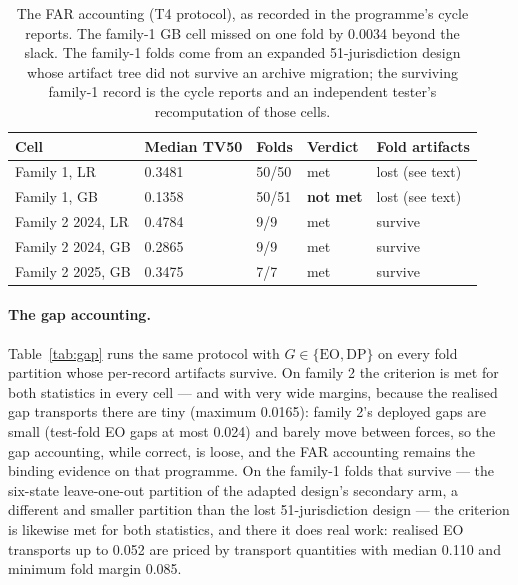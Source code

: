 \documentclass[11pt]{article}
\begin{document}
\begin{table}[h]
\centering
\begin{tabular}{lllll}
\toprule
Cell & Median TV50 & Folds & Verdict & Fold artifacts \\
\midrule
Family 1, LR & 0.3481 & 50/50 & met & lost (see text) \\
Family 1, GB & 0.1358 & 50/51 & \textbf{not met} & lost (see text) \\
Family 2 2024, LR & 0.4784 & 9/9 & met & survive \\
Family 2 2024, GB & 0.2865 & 9/9 & met & survive \\
Family 2 2025, GB & 0.3475 & 7/7 & met & survive \\
\bottomrule
\end{tabular}
\caption{The FAR accounting (T4 protocol), as recorded in the
programme's cycle reports. The family-1 GB cell missed on one fold
by 0.0034 beyond the slack. The family-1 folds come from an
expanded 51-jurisdiction design whose artifact tree did not survive
an archive migration; the surviving family-1 record is the cycle
reports and an independent tester's recomputation of those cells.}
\label{tab:far}
\end{table}

\paragraph{The gap accounting.} Table~\ref{tab:gap} runs the same
protocol with $G \in \{\mathrm{EO}, \mathrm{DP}\}$ on every fold
partition whose per-record artifacts survive. On family 2 the
criterion is met for both statistics in every cell --- and with
very wide margins, because the realised gap transports there are
tiny (maximum 0.0165): family 2's deployed gaps are small (test-fold
EO gaps at most 0.024) and barely move between forces, so the gap
accounting, while correct, is loose, and the FAR accounting remains
the binding evidence on that programme. On the family-1 folds that
survive --- the six-state leave-one-out partition of the adapted
design's secondary arm, a different and smaller partition than the
lost 51-jurisdiction design --- the criterion is likewise met for
both statistics, and there it does real work: realised EO
transports up to 0.052 are priced by transport quantities with
median 0.110 and minimum fold margin 0.085.
\end{document}
